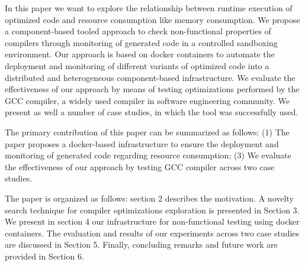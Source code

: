 In this paper we want to explore the relationship between runtime execution of optimized code and resource consumption like memory consumption.
We propose a component-based tooled approach to check non-functional properties of compilers through monitoring of generated code in a controlled sandboxing environment. Our approach is based on docker containers to automate the deployment and monitoring of different variants of optimized code into a distributed and heterogeneous component-based infrastructure. 
We evaluate the effectiveness of our approach by means of testing optimizations performed by the GCC compiler, a widely used compiler in software engineering community. We present as well a number of case studies, in which the tool was successfully used.


The primary contribution of this paper can be summarized as follows: (1) The paper proposes a docker-based infrastructure to ensure the deployment and monitoring of generated code regarding resource consumption; (3) We evaluate the effectiveness of our approach by testing GCC compiler across two case studies.
 

The paper is organized as follows: section 2 describes the motivation. A novelty search technique for compiler optimizations exploration is presented in Section 3. We present in section 4 our infrastructure for non-functional testing using docker containers. The evaluation and results of our experiments across two case studies are discussed in Section 5. Finally, concluding remarks and future work are provided in Section 6.




 
 

